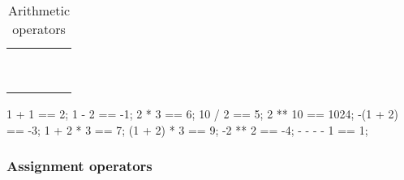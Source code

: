 \newenvironment{operatorTabular}
{
  \begin{tabular}{|*{5}{c|}}
    \hline
    \strong{\whetherHtml{Operator}{Oper.}}
    & \strong{Syntax}
    & \strong{\whetherHtml{Associativity}{Assoc.}}
    & \strong{Semantics}
    & \strong{Equivalence}
    \\
    \hline
  }{
    \\
    \hline
  \end{tabular}
}

\newenvironment{operatorTable}[2]
{
  \def\operatorTableLabel{#1}%
  \def\operatorTableCaption{#2}%
  \begin{table}[\floatposh]
    \centering
    \begin{operatorTabular}
    }{
    \end{operatorTabular}
    \caption{\operatorTableCaption}
    \label{\operatorTableLabel}
  \end{table}
}

\begin{operatorTable}{tab:arith}{Arithmetic operators}
  \operatoruplus\\
  \operatorumin \\
  \hline
  \operatorexp\\
  \hline
  \operatormult\\
  \operatordiv\\
  \operatormod\\
  \hline
  \operatorplus\\
  \operatorminus\\
\end{operatorTable}

\begin{urbiassert}
       1 + 1 ==    2;
       1 - 2 ==   -1;
       2 * 3 ==    6;
      10 / 2 ==    5;
     2 ** 10 == 1024;
    -(1 + 2) ==   -3;
   1 + 2 * 3 ==    7;
 (1 + 2) * 3 ==    9;
     -2 ** 2 ==   -4;
   - - - - 1 ==    1;
\end{urbiassert}

\subsubsection{Assignment operators}

